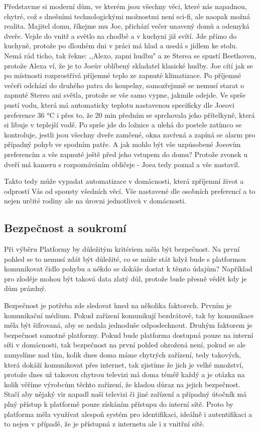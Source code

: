 \documentclass[thesis=B,czech]{FITthesis}[2019/12/23]
\begin{document}
Představme si moderní dům, ve kterém jsou všechny věci, které nás napadnou, chytré, což s dnešními technologickými možnostmi není sci-fi, ale naopak možná realita. Majitel domu, říkejme mu Joe, přichází večer unavený domů a odemyká dveře. Vejde do vnitř a světlo na chodbě a v kuchyni již svítí. Jde přímo do kuchyně, protože po dlouhém dni v práci má hlad a usedá s jídlem ke stolu. Nemá rád ticho, tak řekne: ,,Alexo, zapni hudbu" a ze Sterea se spustí Beethoven, protože Alexa ví, že je to Joeův oblíbený skladatel klasické hudby. Joe cítí jak se po místnosti rozprostřívá příjemné teplo ze zapnuté klimatizace. Po příjemné večeři odchází do druhého patra do koupelny, samozřejmně se nemusí starat o zapnuté Stereo ani světla, protože se vše samo vypne, jakmile odejde. Ve sprše pustí vodu, která má automaticky teplotu nastavenou specificky dle Joeovi preference 36 °C i přes to, že 20 min předním se sprchovala jeho přítelkyně, která si libuje v teplejší vodě. Po sprše jde do ložnice a ulehá do postele zatímco se kontroluje, jestli jsou všechny dveře zamčené, okna zavřená a zapíná se alarm pro případný pohyb ve spodním patře. A jak mohlo být vše uzpůsobené Joeovím preferencím a vše zapnuté ještě před jeho vstupem do domu? Protože zvonek u dveří má kameru s rozpoznáváním obličeje - Joea tedy poznal a vše nastavil.

Takto tedy může vypadat automatizace v domácnosti, která zpříjemní život a odprostí Vás od spousty všedních věcí. Vše nastavené dle osobních preferencí a to nejen určité rodiny ale na úrovni jednotlivců v domácnosti.


\subsection{Bezpečnost a soukromí}
Při výběru Platformy by důležitým kritériem měla být bezpečnost. Na první pohled se to nemusí zdát být důležité, co se může stát když bude s platformou komunikovat čidlo pohybu a někdo se dokáže dostat k těmto údajům? Například pro zloděje mohou být taková data zlatý důl, protože bude přesně vědět kdy je dům prázdný.

Bezpečnost je potřeba zde sledovat hned na několika faktorech. Prvním je komunikační médium. Pokud zařízení komunikují bezdrátově, tak by komunikace měla být šifrovaná, aby se nedala jednoduše odposlechnout. Druhým faktorem je bezpečnost samotné platformy. Pokud bude platforma dostupná pouze na interní síťi v domácnosti, tak bezpečnost na první pohled ohrožená není, pokud se ale zamyslíme nad tím, kolik dnes doma máme chytrých zařízení, tedy takových, která dokáží komunikovat přes internet, tak zjistíme že jich je velké množství, protože dnes už takovou chytrou televizi má doma téměř každý a je otázka na kolik věříme výrobcům těchto zařízení, že kladou důraz na jejich bezpečnost. Stačí aby nějaký vir napadl naší televizi či jiné zařízení a případný útočník má plný přístup k platformě pouze získáním přístupu do interní sítě. Proto by platforma měla využívat alespoň systém pro identifikaci, ideálně i autentifikaci a to nejen v případě, že je přístupná z internetu ale i z vnitřní sítě.
\end{document}
